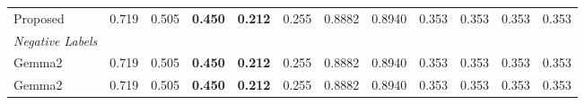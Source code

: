 \begin{table}
{\begin{tabular}{l|cccccccccc||c}
            Proposed                             & 0.719                                                   & 0.505                                                   & \textbf{0.450}                                          & \textbf{0.212}                                                    & 0.255                                                    & 0.8882                                                    & 0.8940                                                            & 0.353                                                    & 0.353                                  & 0.353                                    & 0.353 \\
            \hdashline
            \textit{Negative Labels}           &                                                         &                                                         &                                                         &                                                                   &                                                          &                                                           &                                                                   &                                                          &                                        &                                          &       \\
            Gemma2                             & 0.719                                                   & 0.505                                                   & \textbf{0.450}                                          & \textbf{0.212}                                                    & 0.255                                                    & 0.8882                                                    & 0.8940                                                            & 0.353                                                    & 0.353                                  & 0.353                                    & 0.353 \\
            Gemma2                             & 0.719                                                   & 0.505                                                   & \textbf{0.450}                                          & \textbf{0.212}                                                    & 0.255                                                    & 0.8882                                                    & 0.8940                                                            & 0.353                                                    & 0.353                                  & 0.353                                    & 0.353 \\

\end{tabular}}
\end{table}
